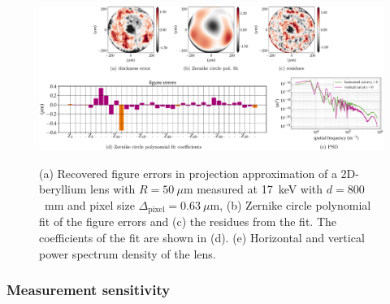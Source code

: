 \begin{refsection}
\begin{figure}[ht]
        \centering
        {\includegraphics[width=1\linewidth]{figures/ch04b/recovered_thickness.pdf}}
        \caption[Recovered figure errors in projection approximation]{(a) Recovered figure errors in projection approximation of a 2D-beryllium lens with $R=50~\mu$m measured at 17~keV with $d=800$~mm and pixel size $\Delta_\text{pixel}= 0.63~\mu$m, (b) Zernike circle polynomial fit of the figure errors and (c) the residues from the fit. The coefficients of the fit are shown in (d). (e) Horizontal and vertical power spectrum density of the lens.}\label{fig:recovered_thickness}
\end{figure}
\clearpage
\subsubsection*{Measurement sensitivity}


\end{refsection}
